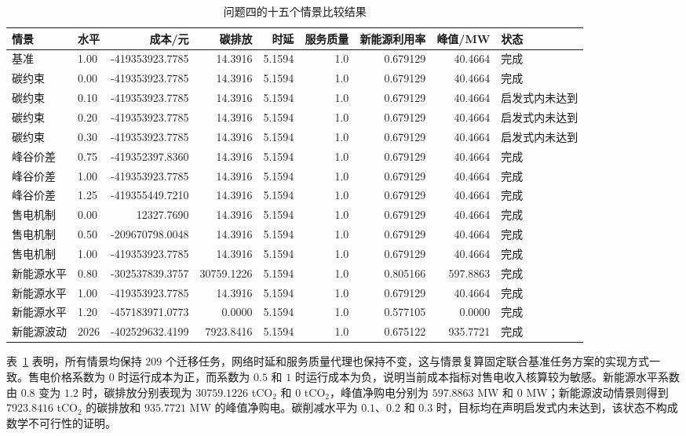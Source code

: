\begin{table}[htbp]
\centering
\caption{问题四的十五个情景比较结果}
\label{tab:q4_scenarios}
\begin{tabular}{llrrrrrrl}
\toprule
情景 & 水平 & 成本/元 & 碳排放 & 时延 & 服务质量 & 新能源利用率 & 峰值/MW & 状态\\
\midrule
基准 & 1.00 & -419353923.7785 & 14.3916 & 5.1594 & 1.0 & 0.679129 & 40.4664 & 完成\\
碳约束 & 0.00 & -419353923.7785 & 14.3916 & 5.1594 & 1.0 & 0.679129 & 40.4664 & 完成\\
碳约束 & 0.10 & -419353923.7785 & 14.3916 & 5.1594 & 1.0 & 0.679129 & 40.4664 & 启发式内未达到\\
碳约束 & 0.20 & -419353923.7785 & 14.3916 & 5.1594 & 1.0 & 0.679129 & 40.4664 & 启发式内未达到\\
碳约束 & 0.30 & -419353923.7785 & 14.3916 & 5.1594 & 1.0 & 0.679129 & 40.4664 & 启发式内未达到\\
峰谷价差 & 0.75 & -419352397.8360 & 14.3916 & 5.1594 & 1.0 & 0.679129 & 40.4664 & 完成\\
峰谷价差 & 1.00 & -419353923.7785 & 14.3916 & 5.1594 & 1.0 & 0.679129 & 40.4664 & 完成\\
峰谷价差 & 1.25 & -419355449.7210 & 14.3916 & 5.1594 & 1.0 & 0.679129 & 40.4664 & 完成\\
售电机制 & 0.00 & 12327.7690 & 14.3916 & 5.1594 & 1.0 & 0.679129 & 40.4664 & 完成\\
售电机制 & 0.50 & -209670798.0048 & 14.3916 & 5.1594 & 1.0 & 0.679129 & 40.4664 & 完成\\
售电机制 & 1.00 & -419353923.7785 & 14.3916 & 5.1594 & 1.0 & 0.679129 & 40.4664 & 完成\\
新能源水平 & 0.80 & -302537839.3757 & 30759.1226 & 5.1594 & 1.0 & 0.805166 & 597.8863 & 完成\\
新能源水平 & 1.00 & -419353923.7785 & 14.3916 & 5.1594 & 1.0 & 0.679129 & 40.4664 & 完成\\
新能源水平 & 1.20 & -457183971.0773 & 0.0000 & 5.1594 & 1.0 & 0.577105 & 0.0000 & 完成\\
新能源波动 & 2026 & -402529632.4199 & 7923.8416 & 5.1594 & 1.0 & 0.675122 & 935.7721 & 完成\\
\bottomrule
\end{tabular}
\end{table}

表~\ref{tab:q4_scenarios} 表明，所有情景均保持 $209$ 个迁移任务，网络时延和服务质量代理也保持不变，这与情景复算固定联合基准任务方案的实现方式一致。售电价格系数为 $0$ 时运行成本为正，而系数为 $0.5$ 和 $1$ 时运行成本为负，说明当前成本指标对售电收入核算较为敏感。新能源水平系数由 $0.8$ 变为 $1.2$ 时，碳排放分别表现为 $30759.1226$ tCO$_2$ 和 $0$ tCO$_2$，峰值净购电分别为 $597.8863$ MW 和 $0$ MW；新能源波动情景则得到 $7923.8416$ tCO$_2$ 的碳排放和 $935.7721$ MW 的峰值净购电。碳削减水平为 $0.1$、$0.2$ 和 $0.3$ 时，目标均在声明启发式内未达到，该状态不构成数学不可行性的证明。

